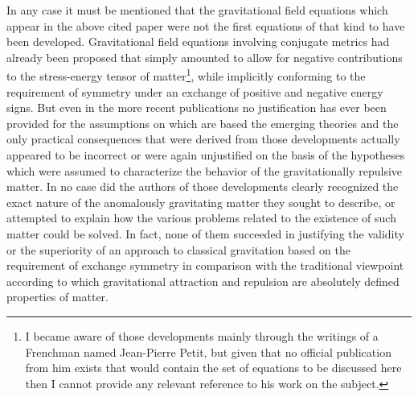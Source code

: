 \documentclass[notitlepage,12pt]{report}
\begin{document}
In any case it must be mentioned that the gravitational field equations which appear in the above cited paper were not the first equations of that kind to have been developed. Gravitational field equations involving conjugate metrics had already been proposed that simply amounted to allow for negative contributions to the stress-energy tensor of matter\footnote{I became aware of those developments mainly through the writings of a Frenchman named Jean-Pierre Petit, but given that no official publication from him exists that would contain the set of equations to be discussed here then I cannot provide any relevant reference to his work on the subject.}, while implicitly conforming to the requirement of symmetry under an exchange of positive and negative energy signs. But even in the more recent publications no justification has ever been provided for the assumptions on which are based the emerging theories and the only practical consequences that were derived from those developments actually appeared to be incorrect or were again unjustified on the basis of the hypotheses which were assumed to characterize the behavior of the gravitationally repulsive matter. In no case did the authors of those developments clearly recognized the exact nature of the anomalously gravitating matter they sought to describe, or attempted to explain how the various problems related to the existence of such matter could be solved. In fact, none of them succeeded in justifying the validity or the superiority of an approach to classical gravitation based on the requirement of exchange symmetry in comparison with the traditional viewpoint according to which gravitational attraction and repulsion are absolutely defined properties of matter.
\end{document}
